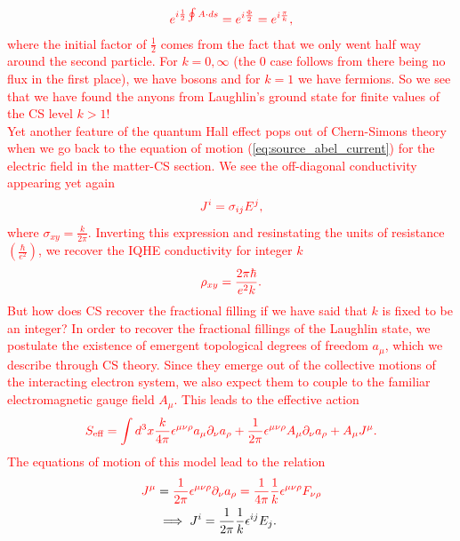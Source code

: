 \begin{align}
    \textcolor{red}{e^{i \frac{1}{2} \oint A \cdot ds}=e^{i \frac{\Phi}{2}}= e^{i \frac{\pi}{k}},}
\end{align}
 \textcolor{red}{where the initial factor of $\frac{1}{2}$ comes from the fact that we only went half way around the second particle. For $k=0,\infty$ (the 0 case follows from there being no flux in the first place), we have bosons and for $k=1$ we have fermions. So we see that we have found the anyons from Laughlin's ground state for finite values of the CS level $k>1$!}\\
\indent \textcolor{red}{Yet another feature of the quantum Hall effect pops out of Chern-Simons theory when we go back to the equation of motion (\ref{eq:source_abel_current}) for the electric field in the matter-CS section. We see the off-diagonal conductivity appearing yet again}
\begin{align}
    \textcolor{red}{J^{i} = \sigma_{ij}E^j,}
\end{align}
 \textcolor{red}{where $\sigma_{xy}=\frac{k}{2\pi}$. Inverting this expression and resinstating the units of resistance $\left(\frac{\hbar}{e^2}\right)$, we recover the IQHE conductivity for integer $k$}
\begin{align}
    \textcolor{red}{\rho_{xy} =\frac{2\pi \hbar}{e^2 k}.}
\end{align}
 \textcolor{red}{But how does CS recover the fractional filling if we have said that $k$ is fixed to be an integer? In order to recover the fractional fillings of the Laughlin state, we postulate the existence of emergent topological degrees of freedom $a_{\mu}$, which we describe through CS theory. Since they emerge out of the collective motions of the interacting electron system, we also expect them to couple to the familiar electromagnetic gauge field $A_{\mu}$. This leads to the effective action}
\begin{align}
    \textcolor{red}{S_{\text{eff}} = \int d^3x \frac{k}{4\pi} \epsilon^{\mu \nu \rho} a_{\mu} \partial_{\nu} a_{\rho} + \frac{1}{2 \pi} \epsilon^{\mu \nu \rho} A_{\mu} \partial_{\nu}a_{\rho}+ A_{\mu} J^{\mu}.}
\end{align}
 \textcolor{red}{The equations of motion of this model lead to the relation}
\begin{align}
    \textcolor{red}{J^{\mu}} &= \textcolor{red}{\frac{1}{2\pi} \epsilon^{\mu \nu \rho} \partial_\nu a_{\rho} = \frac{1}{4\pi} \frac{1}{k} \epsilon^{\mu \nu \rho} F_{\nu \rho} }\\
    &\implies J^{i} = \frac{1}{2 \pi} \frac{1}{k} \epsilon^{i j} E_{j}.
\end{align}
